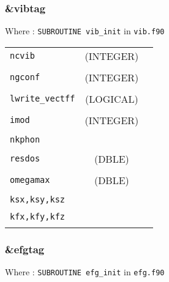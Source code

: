 \documentclass[10pt,a4paper]{article}
\begin{document}
\subsubsection{\&vibtag}

Where : \verb?SUBROUTINE vib_init? in \verb?vib.f90?

\begin{tabular}{lcc}
\\
\verb?ncvib?  & (INTEGER) & \\
\\
\verb?ngconf? & (INTEGER)  & \\
\\
\verb?lwrite_vectff? & (LOGICAL)  & \\
\\
\verb?imod? & (INTEGER)  & \\
\\
\verb?nkphon? & & \\
\\
\verb?resdos? & (DBLE) & \\
\\
\verb?omegamax? & (DBLE) & \\
\\
\verb?ksx,ksy,ksz? & & \\
\\
\verb?kfx,kfy,kfz? & & \\
\\
\end{tabular}


\subsubsection{\&efgtag}

Where : \verb?SUBROUTINE efg_init? in \verb?efg.f90?
\end{document}
